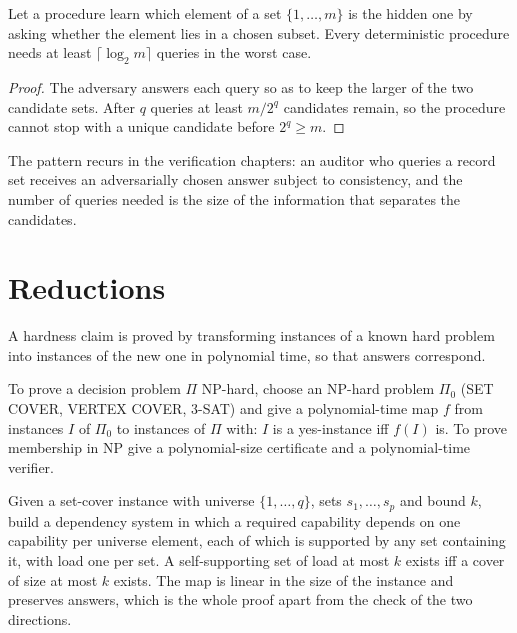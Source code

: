 \begin{newresult}\label{pa:adversary}
Let a procedure learn which element of a set $\{1,\dots,m\}$ is the hidden one by asking whether the element lies in a chosen subset. Every deterministic procedure needs at least $\lceil\log_2m\rceil$ queries in the worst case.
\end{newresult}
\begin{proof}
The adversary answers each query so as to keep the larger of the two candidate sets. After $q$ queries at least $m/2^q$ candidates remain, so the procedure cannot stop with a unique candidate before $2^q\ge m$.
\end{proof}

The pattern recurs in the verification chapters: an auditor who queries a record set receives an adversarially chosen answer subject to consistency, and the number of queries needed is the size of the information that separates the candidates.

\section{Reductions}

A hardness claim is proved by transforming instances of a known hard problem into instances of the new one in polynomial time, so that answers correspond.

\begin{established}\label{pa:reduction}
To prove a decision problem $\Pi$ NP-hard, choose an NP-hard problem $\Pi_0$ (SET COVER, VERTEX COVER, 3-SAT) and give a polynomial-time map $f$ from instances $I$ of $\Pi_0$ to instances of $\Pi$ with: $I$ is a yes-instance iff $f(I)$ is. To prove membership in NP give a polynomial-size certificate and a polynomial-time verifier.
\end{established}

\begin{example}\label{pa:ex-reduction}
Given a set-cover instance with universe $\{1,\dots,q\}$, sets $s_1,\dots,s_p$ and bound $k$, build a dependency system in which a required capability depends on one capability per universe element, each of which is supported by any set containing it, with load one per set. A self-supporting set of load at most $k$ exists iff a cover of size at most $k$ exists. The map is linear in the size of the instance and preserves answers, which is the whole proof apart from the check of the two directions.
\end{example}

